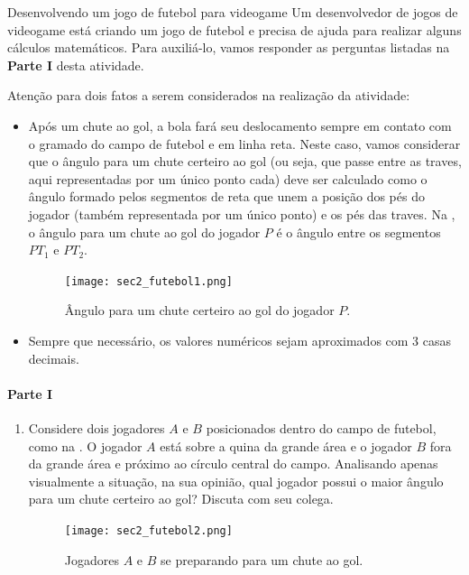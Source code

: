 \begin{task}{Desenvolvendo um jogo de futebol para videogame}
\label{desenvolvendo-jogo}
Um desenvolvedor de jogos de videogame está criando um jogo de futebol e precisa de ajuda para realizar alguns cálculos matemáticos. Para auxiliá-lo, vamos responder as perguntas listadas na \textbf{Parte I} desta atividade. 

\medskip

Atenção para dois fatos a serem considerados na realização da atividade: 
\begin{itemize}
    \item {}
     Após um chute ao gol, a bola fará seu deslocamento sempre em contato com o gramado do campo de futebol e em linha reta. Neste caso, vamos considerar que o ângulo para um chute certeiro ao gol (ou seja, que passe entre as traves, aqui representadas por um único ponto cada) deve ser calculado como o ângulo formado pelos segmentos de reta que unem a posição dos pés do jogador (também representada por um único ponto) e os pés das traves. Na  , o ângulo para um chute ao gol do jogador $P$ é o ângulo entre os segmentos $PT_1$ e $PT_2$.
\begin{figure}[H]
    \centering
    \texttt{[image: sec2\_futebol1.png]}
    \caption{Ângulo para um chute certeiro ao gol do jogador $P$.}
    \label{sec2_futebol1_fig}
\end{figure}



    \item{}
    Sempre que necessário, os valores numéricos sejam aproximados com 3 casas decimais.
\end{itemize}
\newpage

\paragraph{Parte I}

\begin{enumerate}
    \item{}
    Considere dois jogadores $A$ e $B$ posicionados dentro do campo de futebol, como na . O jogador $A$ está sobre a quina da grande área e o jogador $B$ fora da grande área e próximo ao círculo central do campo. Analisando apenas visualmente a situação, na sua opinião, qual jogador possui o maior ângulo para um chute certeiro ao gol? Discuta com seu colega.
\begin{figure}[H]
    \centering
    \texttt{[image: sec2\_futebol2.png]}
    \caption{Jogadores $A$ e $B$ se preparando para um chute ao gol.}
    \label{sec2_futebol2_fig}
\end{figure}




\end{enumerate}
\end{task}
